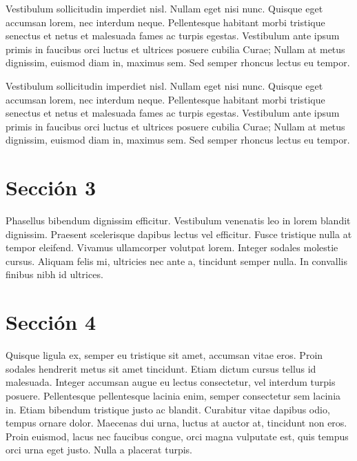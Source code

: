 	Vestibulum sollicitudin imperdiet nisl. Nullam eget nisi nunc. Quisque eget accumsan lorem, nec interdum neque. Pellentesque habitant morbi tristique senectus et netus et malesuada fames ac turpis egestas. Vestibulum ante ipsum primis in faucibus orci luctus et ultrices posuere cubilia Curae; Nullam at metus dignissim, euismod diam in, maximus sem. Sed semper rhoncus lectus eu tempor.
	
	Vestibulum sollicitudin imperdiet nisl. Nullam eget nisi nunc. Quisque eget accumsan lorem, nec interdum neque. Pellentesque habitant morbi tristique senectus et netus et malesuada fames ac turpis egestas. Vestibulum ante ipsum primis in faucibus orci luctus et ultrices posuere cubilia Curae; Nullam at metus dignissim, euismod diam in, maximus sem. Sed semper rhoncus lectus eu tempor.
	
	\section{Sección 3}
	
	Phasellus bibendum dignissim efficitur. Vestibulum venenatis leo in lorem blandit dignissim. Praesent scelerisque dapibus lectus vel efficitur. Fusce tristique nulla at tempor eleifend. Vivamus ullamcorper volutpat lorem. Integer sodales molestie cursus. Aliquam felis mi, ultricies nec ante a, tincidunt semper nulla. In convallis finibus nibh id ultrices.

	\section{Sección 4}
	Quisque ligula ex, semper eu tristique sit amet, accumsan vitae eros. Proin sodales hendrerit metus sit amet tincidunt. Etiam dictum cursus tellus id malesuada. Integer accumsan augue eu lectus consectetur, vel interdum turpis posuere. Pellentesque pellentesque lacinia enim, semper consectetur sem lacinia in. Etiam bibendum tristique justo ac blandit. Curabitur vitae dapibus odio, tempus ornare dolor. Maecenas dui urna, luctus at auctor at, tincidunt non eros. Proin euismod, lacus nec faucibus congue, orci magna vulputate est, quis tempus orci urna eget justo. Nulla a placerat turpis.
